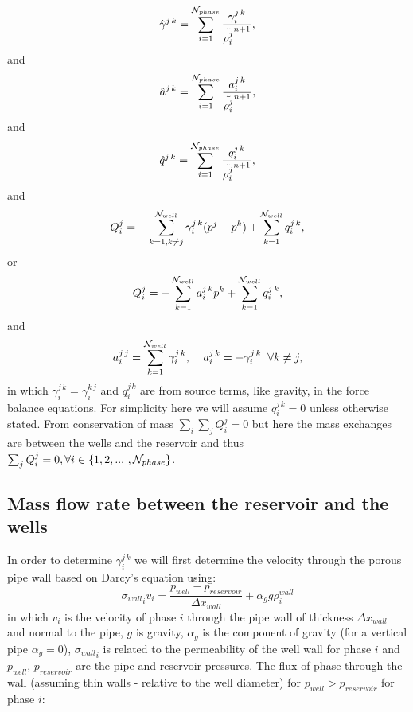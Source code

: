\begin{equation}
\hat\gamma^{j\,k}=\sum_{i=1}^{ {\cal N}_{phase} }  \frac{ \gamma^{j\,k}_i }{ \tilde{\rho_i^j}^{n+1} },
\label{saturation_wells_6}
\end{equation}
and
\begin{equation}
\hat a^{j\,k}=\sum_{i=1}^{ {\cal N}_{phase} }  \frac{ a^{j\,k}_i }{ \tilde{\rho_i^j}^{n+1} },
\label{saturation_wells_6-a}
\end{equation}
and
\begin{equation}
\hat q^{j\,k}=\sum_{i=1}^{ {\cal N}_{phase} }  \frac{ q^{j\,k}_i }{ \tilde{\rho_i^j}^{n+1} },
\label{saturation_wells_6b}
\end{equation}
and
\begin{equation}
Q_i^{j} = 
-\sum_{k=1, k\neq j}^{{\cal N}_{well}}\gamma^{j\,k}_i  (p^j - p^k)   
+ \sum_{k=1}^{{\cal N}_{well}} q^{j\,k}_i, 
\label{saturation_wells_7}
\end{equation}
or 
\begin{equation}
Q_i^{j} = 
-\sum_{k=1}^{{\cal N}_{well}} a^{j\,k}_i  p^k 
+ \sum_{k=1}^{{\cal N}_{well}} q^{j\,k}_i, 
\label{saturation_wells_7-a}
\end{equation}
and 
\begin{equation}
a^{j\,j}_i= \sum_{k=1}^{ {\cal N}_{well} }  \gamma^{j\,k}_i , \;\;\;\;
a^{j\,k}_i=  -  \gamma^{j\,k}_i \;\; \forall k\neq j , 
\label{saturation_wells_8-a}
\end{equation}
in which $\gamma^{j\,k}_i=\gamma^{k\,j}_i$ and $q^{j\,k}_i$ are from source terms, like gravity, in the 
force balance equations. For simplicity here we will assume $q^{j\,k}_i=0$ unless otherwise stated. 
From conservation of mass $\sum_i\sum_j Q^j_i=0$ but here the mass exchanges are between the wells and 
the reservoir and thus $\sum_j Q^j_i=0, \forall i \in\{ 1,2,...~ , {\cal N}_{phase}\}$. 


\subsection{Mass flow rate between the reservoir and the wells} 
\label{Mass flow rate between the reservoir and the wells} 
In order to determine $\gamma^{j\,k}_i$ we will first determine the 
velocity through the porous pipe wall based on Darcy's equation using:
\begin{equation}
{\sigma_{wall}}_i v_i = \frac{ p_{well} - p_{reservoir} }{{\Delta x}_{wall}} +\alpha_g g \rho_i^{wall}
\label{saturation_wells_8}
\end{equation}
in which $v_i$ is the velocity of phase $i$ through the pipe wall of thickness ${\Delta x}_{wall}$ and normal to the pipe, 
$g$ is gravity, $\alpha_g$ is the component of gravity (for a vertical pipe $\alpha_g=0$),  
${\sigma_{wall}}_i$ is related to the permeability of the well wall for phase $i$ 
and 
$p_{well}$,  $p_{reservoir}$ are the pipe and reservoir pressures. 
The flux of phase through the wall (assuming thin walls - relative to the well diameter) 
for $p_{well}>p_{reservoir}$ for phase $i$: 

